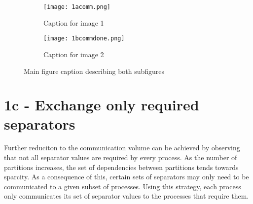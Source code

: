 

\begin{figure}[H]
    \centering
    \begin{subfigure}[t]{0.45\textwidth}
        \centering
        \texttt{[image: 1acomm.png]}
        \caption{Caption for image 1}
        \label{fig:1bcomm1}
    \end{subfigure}
    \hfill
    \begin{subfigure}[t]{0.45\textwidth}
        \centering
        \texttt{[image: 1bcommdone.png]}
        \caption{Caption for image 2}
        \label{fig:1bcomm2}
    \end{subfigure}
    \caption{Main figure caption describing both subfigures}
    \label{fig:1bcomm}
\end{figure}


\section{1c - Exchange only required separators}
Further reduciton to the communication volume can be achieved by observing that not all separator values are required by every process. As the number of partitions increases, the set of dependencies between partitions tends towards sparcity. As a consequence of this, certain sets of separators may only need to be communicated to a given subset of processes. Using this strategy, each process only communicates its set of separator values to the processes that require them.



